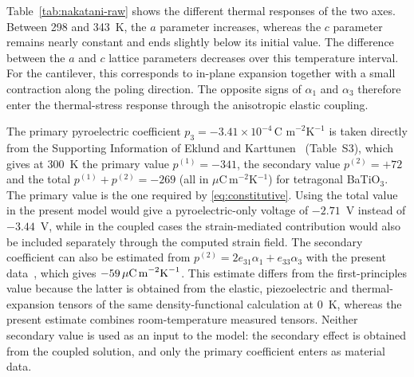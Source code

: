 \documentclass[a4paper,12pt]{elsarticle}
\begin{document}
Table~\ref{tab:nakatani-raw} shows the different thermal responses of the two axes.
Between 298 and 343~K, the $a$ parameter increases, whereas the $c$ parameter remains
nearly constant and ends slightly below its initial value. The difference between the $a$ and $c$ lattice parameters decreases over
this temperature interval. For the cantilever,
this corresponds to in-plane expansion together with a small contraction along the
poling direction. The opposite signs of $\alpha_1$ and $\alpha_3$ therefore enter the
thermal-stress response through the anisotropic elastic coupling.

The primary pyroelectric coefficient
$p_3=-3.41\times10^{-4}\,\text{C m}^{-2}\text{K}^{-1}$
is taken directly from the Supporting Information of Eklund and Karttunen~\cite{EklundKarttunen2023} (Table~S3), which gives at 300~K the primary value
$p^{(1)}=-341$, the secondary value $p^{(2)}=+72$ and the total
$p^{(1)}+p^{(2)}=-269$ (all in $\mu$C\,m$^{-2}$K$^{-1}$) for tetragonal BaTiO$_3$.
The primary value is the one required by \eqref{eq:constitutive}. Using the total value
in the present model would give a pyroelectric-only voltage of $-2.71$~V instead of
$-3.44$~V, while in the coupled cases the strain-mediated contribution would also be
included separately through the computed strain field. The secondary coefficient can
also be estimated from
$p^{(2)}=2e_{31}\alpha_1+e_{33}\alpha_3$
with the present data~\cite{Zgonik1994,Nakatani2016}, which gives
$-59\,\mu\text{C\,m}^{-2}\text{K}^{-1}$. This estimate differs from the
first-principles value because the latter is obtained from the elastic, piezoelectric
and thermal-expansion tensors of the same density-functional calculation at 0~K,
whereas the present estimate combines room-temperature measured tensors. Neither
secondary value is used as an input to the model: the secondary effect is obtained from
the coupled solution, and only the primary coefficient enters as material data.
\end{document}
